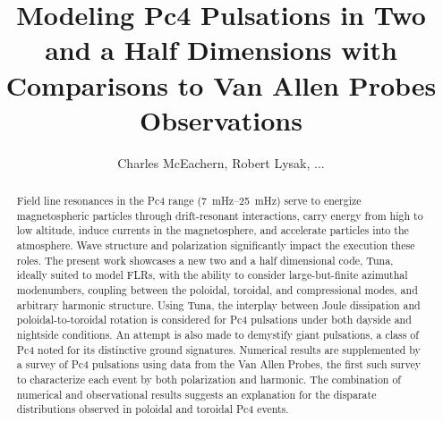 \documentclass[jgrga]{agutex}
\begin{document}
\title{Modeling Pc4 Pulsations in Two and a Half Dimensions with
       Comparisons to Van Allen Probes Observations}
\author{Charles McEachern, Robert Lysak, ...}


\linespread{2}



\begin{abstract}

Field line resonances in the Pc4 range (\SIrange{7}{25}{\mHz}) serve
to energize magnetospheric particles through drift-resonant
interactions, carry energy from high to low altitude, induce currents in
the magnetosphere, and accelerate particles into the atmosphere. Wave
structure and polarization significantly impact the execution these
roles. The present work showcases a new two and a half dimensional code,
Tuna, ideally suited to model FLRs, with the ability to consider
large-but-finite azimuthal modenumbers, coupling between the poloidal,
toroidal, and compressional modes, and arbitrary harmonic structure.
Using Tuna, the interplay between Joule dissipation and
poloidal-to-toroidal rotation is considered for Pc4 pulsations under
both dayside and nightside conditions. An attempt is also made to
demystify giant pulsations, a class of Pc4 noted for its distinctive
ground signatures. Numerical results are supplemented by a survey of
 Pc4 pulsations using data from the Van Allen Probes, the first
such survey to characterize each event by both polarization and
harmonic. The combination of numerical and observational results
suggests an explanation for the disparate distributions observed in
poloidal and toroidal Pc4 events. 

\end{abstract}
\end{document}
